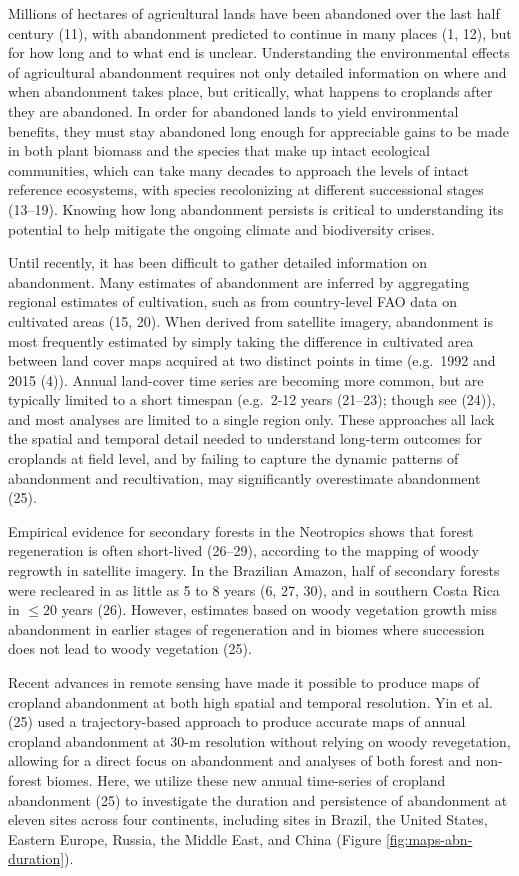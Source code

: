 \documentclass[9pt,twocolumn,twoside,]{pnas-new}
\begin{document}
Millions of hectares of agricultural lands have been abandoned over the last half century (11), with abandonment predicted to continue in many places (1, 12), but for how long and to what end is unclear.
Understanding the environmental effects of agricultural abandonment requires not only detailed information on where and when abandonment takes place, but critically, what happens to croplands after they are abandoned.
In order for abandoned lands to yield environmental benefits, they must stay abandoned long enough for appreciable gains to be made in both plant biomass and the species that make up intact ecological communities, which can take many decades to approach the levels of intact reference ecosystems, with species recolonizing at different successional stages (13--19).
Knowing how long abandonment persists is critical to understanding its potential to help mitigate the ongoing climate and biodiversity crises.

Until recently, it has been difficult to gather detailed information on abandonment.
Many estimates of abandonment are inferred by aggregating regional estimates of cultivation, such as from country-level FAO data on cultivated areas (15, 20).
When derived from satellite imagery, abandonment is most frequently estimated by simply taking the difference in cultivated area between land cover maps acquired at two distinct points in time (e.g.~1992 and 2015 (4)).
Annual land-cover time series are becoming more common, but are typically limited to a short timespan (e.g.~2-12 years (21--23); though see (24)), and most analyses are limited to a single region only.
These approaches all lack the spatial and temporal detail needed to understand long-term outcomes for croplands at field level, and by failing to capture the dynamic patterns of abandonment and recultivation, may significantly overestimate abandonment (25).

Empirical evidence for secondary forests in the Neotropics shows that forest regeneration is often short-lived (26--29), according to the mapping of woody regrowth in satellite imagery.
In the Brazilian Amazon, half of secondary forests were recleared in as little as 5 to 8 years (6, 27, 30), and in southern Costa Rica in \(\leq20\) years (26).
However, estimates based on woody vegetation growth miss abandonment in earlier stages of regeneration and in biomes where succession does not lead to woody vegetation (25).

Recent advances in remote sensing have made it possible to produce maps of cropland abandonment at both high spatial and temporal resolution.
Yin et al. (25) used a trajectory-based approach to produce accurate maps of annual cropland abandonment at 30-m resolution without relying on woody revegetation, allowing for a direct focus on abandonment and analyses of both forest and non-forest biomes.
Here, we utilize these new annual time-series of cropland abandonment (25) to investigate the duration and persistence of abandonment at eleven sites across four continents, including sites in Brazil, the United States, Eastern Europe, Russia, the Middle East, and China (Figure \ref{fig:maps-abn-duration}).
\end{document}
